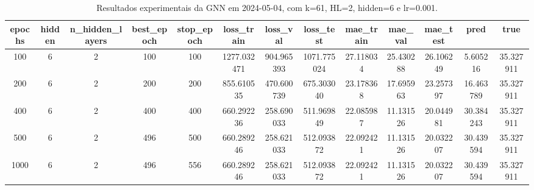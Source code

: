 \begin{table}[h]
\centering
\caption{Resultados experimentais da GNN em 2024-05-04, com k=61, HL=2, hidden=6 e lr=0.001.}
\label{tab:gnn_results_k61_hl2_h6_d20240504}
\begin{tabular}{ccccccccccccc}
\toprule
epochs & hidden & n\_hidden\_layers & best\_epoch & stop\_epoch & loss\_train & loss\_val & loss\_test & mae\_train & mae\_val & mae\_test & pred & true \\
\midrule
100 & 6 & 2 & 100 & 100 & 1277.032471 & 904.965393 & 1071.775024 & 27.118034 & 25.430288 & 26.106249 & 5.605216 & 35.327911 \\
200 & 6 & 2 & 200 & 200 & 855.610535 & 470.600739 & 675.303040 & 23.178368 & 17.695963 & 23.257397 & 16.463789 & 35.327911 \\
400 & 6 & 2 & 400 & 400 & 660.292236 & 258.690033 & 511.969849 & 22.085987 & 11.131526 & 20.044981 & 30.384243 & 35.327911 \\
500 & 6 & 2 & 496 & 500 & 660.289246 & 258.621033 & 512.093872 & 22.092421 & 11.131526 & 20.032207 & 30.439594 & 35.327911 \\
1000 & 6 & 2 & 496 & 556 & 660.289246 & 258.621033 & 512.093872 & 22.092421 & 11.131526 & 20.032207 & 30.439594 & 35.327911 \\
\bottomrule
\end{tabular}
\end{table}
